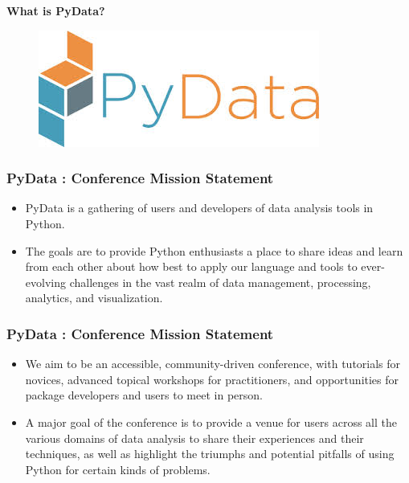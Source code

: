 \documentclass[MASTER.tex]{subfiles}
\begin{document}
 
	\begin{frame}
		\textbf{What is PyData?}
		\begin{figure}
			\centering
			\includegraphics[width=1.05\linewidth]{pydatalogo}
			
		\end{figure}
		
	\end{frame}
	\begin{frame}
		\frametitle{PyData :  Conference Mission Statement}
		\Large
		
		\begin{itemize}
			\item PyData is a gathering of users and developers of data analysis tools in Python. \bigskip
			\item The goals are to provide Python enthusiasts a place to share ideas and learn from each other about how best to apply our language and tools to ever-evolving challenges in the vast realm of data management, processing, analytics, and visualization.
		\end{itemize}
		
		
	\end{frame}
	\begin{frame}
		\Large
		\frametitle{PyData :  Conference Mission Statement}
		\Large
		\begin{itemize}
			\item We aim to be an accessible, community-driven conference, with tutorials for novices, advanced topical workshops for practitioners, and opportunities for package developers and users to meet in person.
			
			\item A major goal of the conference is to provide a venue for users across all the various domains of data analysis to share their experiences and their techniques, as well as highlight the triumphs and potential pitfalls of using Python for certain kinds of problems.
		\end{itemize}
	\end{frame}
\end{document}
